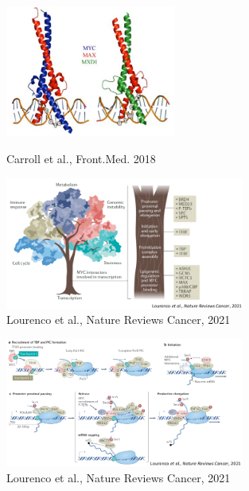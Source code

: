 \begin{figure}[!htb]
   \begin{minipage}{0.48\textwidth}
     \centering
    \includegraphics[width=0.5\textwidth]{../_resources/017e543a7782177edd93188be60ae382.png}
	\caption{Carroll et al., Front.Med. 2018}
	\label{fig:maxmyc}
   \end{minipage}\hfill
   \begin{minipage}{0.48\textwidth}
     \centering
     \includegraphics[width=0.7\textwidth]{../_resources/e218faf59750ef1a90a9e45629f08973.png}
	\caption{Lourenco et al., Nature Reviews Cancer, 2021}
	\label{fig:regmyc}
   \end{minipage}
\end{figure}

\begin{figure}
\centering
\includegraphics[width=0.7\textwidth]{../_resources/10a2ad3114504053030a1071443aabd7.png}
\caption{Lourenco et al., Nature Reviews Cancer, 2021}
\label{fig:ppmyc}
\end{figure}

